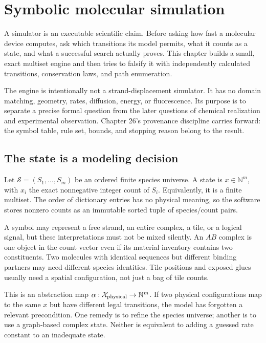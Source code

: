 \chapter{Symbolic molecular simulation}
A simulator is an executable scientific claim. Before asking how fast a molecular
device computes, ask which transitions its model permits, what it counts as a
state, and what a successful search actually proves. This chapter builds a small,
exact multiset engine and then tries to falsify it with independently calculated
transitions, conservation laws, and path enumeration.

The engine is intentionally not a strand-displacement simulator. It has no domain
matching, geometry, rates, diffusion, energy, or fluorescence. Its purpose is to
separate a precise formal question from the later questions of chemical realization
and experimental observation. Chapter 26's provenance discipline carries forward:
the symbol table, rule set, bounds, and stopping reason belong to the result.

\section{The state is a modeling decision}
Let $\mathcal S=(S_1,\ldots,S_m)$ be an ordered finite species universe. A state is
$x\in\mathbb N^m$, with $x_i$ the exact nonnegative integer count of $S_i$.
Equivalently, it is a finite multiset. The order of dictionary entries has no
physical meaning, so the software stores nonzero counts as an immutable sorted
tuple of species/count pairs.


A symbol may represent a free strand, an entire complex, a tile, or a logical
signal, but these interpretations must not be mixed silently. An $AB$ complex is
one object in the count vector even if its material inventory contains two
constituents. Two molecules with identical sequences but different binding
partners may need different species identities. Tile positions and exposed glues
usually need a spatial configuration, not just a bag of tile counts.

This is an abstraction map $\alpha:\mathcal X_{\rm physical}\to\mathbb N^m$.
If two physical configurations map to the same $x$ but have different legal
transitions, the model has forgotten a relevant precondition. One remedy is to
refine the species universe; another is to use a graph-based complex state. Neither
is equivalent to adding a guessed rate constant to an inadequate state.

